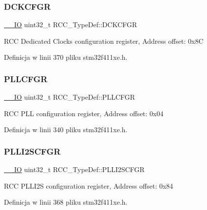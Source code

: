 \subsubsection{\texorpdfstring{D\+C\+K\+C\+F\+GR}{DCKCFGR}}
{\footnotesize\ttfamily \hyperlink{core__sc300_8h_aec43007d9998a0a0e01faede4133d6be}{\+\_\+\+\_\+\+IO} uint32\+\_\+t R\+C\+C\+\_\+\+Type\+Def\+::\+D\+C\+K\+C\+F\+GR}

R\+CC Dedicated Clocks configuration register, Address offset\+: 0x8C 

Definicja w linii 370 pliku stm32f411xe.\+h.

\mbox{\label{struct_r_c_c___type_def_a2a7ccb4e23cb05a574f243f6278b7b26}} 
\subsubsection{\texorpdfstring{P\+L\+L\+C\+F\+GR}{PLLCFGR}}
{\footnotesize\ttfamily \hyperlink{core__sc300_8h_aec43007d9998a0a0e01faede4133d6be}{\+\_\+\+\_\+\+IO} uint32\+\_\+t R\+C\+C\+\_\+\+Type\+Def\+::\+P\+L\+L\+C\+F\+GR}

R\+CC P\+LL configuration register, Address offset\+: 0x04 

Definicja w linii 340 pliku stm32f411xe.\+h.

\mbox{\label{struct_r_c_c___type_def_ac3beb02dccd9131d6ce55bb29c5fa69f}} 
\subsubsection{\texorpdfstring{P\+L\+L\+I2\+S\+C\+F\+GR}{PLLI2SCFGR}}
{\footnotesize\ttfamily \hyperlink{core__sc300_8h_aec43007d9998a0a0e01faede4133d6be}{\+\_\+\+\_\+\+IO} uint32\+\_\+t R\+C\+C\+\_\+\+Type\+Def\+::\+P\+L\+L\+I2\+S\+C\+F\+GR}

R\+CC P\+L\+L\+I2S configuration register, Address offset\+: 0x84 

Definicja w linii 368 pliku stm32f411xe.\+h.

\mbox{\label{struct_r_c_c___type_def_a646631532167f3386763a2d10a881a04}} 
